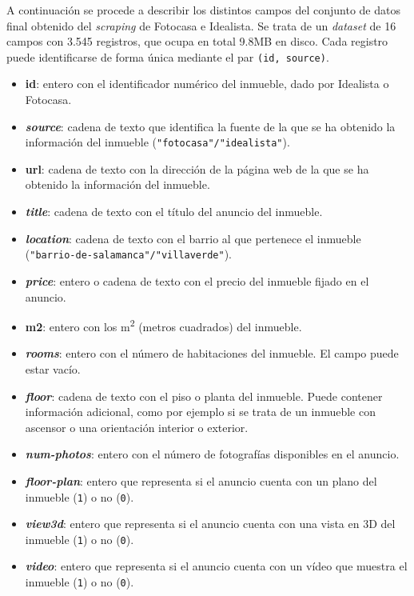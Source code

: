 \documentclass[12pt]{article}
\begin{document}
A continuación se procede a describir los distintos campos del conjunto de datos final obtenido del \textit{scraping} de Fotocasa e Idealista. Se trata de un \textit{dataset} de 16 campos con 3.545 registros, que ocupa en total 9.8MB en disco. Cada registro puede identificarse de forma única mediante el par \verb|(id, source)|.

\begin{itemize}[topsep=0cm,partopsep=0cm]
	\setlength\itemsep{-0.5em}
	\item \textbf{id}: entero con el identificador numérico del inmueble, dado por Idealista o Fotocasa.
	\item \textbf{\textit{source}}: cadena de texto que identifica la fuente de la que se ha obtenido la información del inmueble (\verb|"fotocasa"/"idealista"|).
	\item \textbf{url}: cadena de texto con la dirección de la página web de la que se ha obtenido la información del inmueble.
	\item \textbf{\textit{title}}: cadena de texto con el título del anuncio del inmueble.
	\item \textbf{\textit{location}}: cadena de texto con el barrio al que pertenece el inmueble \\ (\verb|"barrio-de-salamanca"/"villaverde"|).
	\item \textbf{\textit{price}}: entero o cadena de texto con el precio del inmueble fijado en el anuncio.
	\item \textbf{m2}: entero con los m\textsuperscript{2} (metros cuadrados) del inmueble.
	\item \textbf{\textit{rooms}}: entero con el número de habitaciones del inmueble. El campo puede estar vacío.
	\item \textbf{\textit{floor}}: cadena de texto con el piso o planta del inmueble. Puede contener información adicional, como por ejemplo si se trata de un inmueble con ascensor o una orientación interior o exterior.
	\item \textbf{\textit{num-photos}}: entero con el número de fotografías disponibles en el anuncio.
	\item \textbf{\textit{floor-plan}}: entero que representa si el anuncio cuenta con un plano del inmueble (\verb|1|) o no (\verb|0|).
	\item \textbf{\textit{view3d}}: entero que representa si el anuncio cuenta con una vista en 3D del inmueble (\verb|1|) o no (\verb|0|).
	\item \textbf{\textit{video}}: entero que representa si el anuncio cuenta con un vídeo que muestra el inmueble (\verb|1|) o no (\verb|0|).

\end{itemize}
\end{document}
